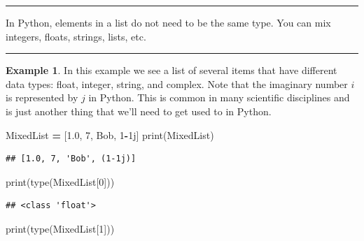 \documentclass[
]{book}
\newenvironment{Shaded}{\begin{snugshade}}{\end{snugshade}}
\newcommand{\BuiltInTok}[1]{#1}
\newcommand{\DecValTok}[1]{\textcolor[rgb]{0.00,0.00,0.81}{#1}}
\newcommand{\FloatTok}[1]{\textcolor[rgb]{0.00,0.00,0.81}{#1}}
\newcommand{\NormalTok}[1]{#1}
\newcommand{\OperatorTok}[1]{\textcolor[rgb]{0.81,0.36,0.00}{\textbf{#1}}}
\newcommand{\OtherTok}[1]{\textcolor[rgb]{0.56,0.35,0.01}{#1}}
\newcommand{\StringTok}[1]{\textcolor[rgb]{0.31,0.60,0.02}{#1}}
\theoremstyle{definition}
\theoremstyle{definition}
\newtheorem{example}{Example}[chapter]
\theoremstyle{definition}
\theoremstyle{remark}
\begin{document}
\begin{center}\rule{0.5\linewidth}{0.5pt}\end{center}

In Python, elements in a list do not need to be the same type. You can mix integers, floats, strings, lists, etc.

\begin{center}\rule{0.5\linewidth}{0.5pt}\end{center}

\begin{example}
\protect\hypertarget{exm:unnamed-chunk-642}{}{\label{exm:unnamed-chunk-642} }In this example we see a list of several items that have different data types: float, integer, string, and complex. Note that the imaginary number \(i\) is represented by \(j\) in Python. This is common in many scientific disciplines and is just another thing that we'll need to get used to in Python.
\end{example}

\begin{Shaded}
\begin{Highlighting}[]
\NormalTok{MixedList }\OperatorTok{=}\NormalTok{ [}\FloatTok{1.0}\NormalTok{, }\DecValTok{7}\NormalTok{, }\StringTok{\textquotesingle{}Bob\textquotesingle{}}\NormalTok{, }\DecValTok{1}\OperatorTok{{-}}\OtherTok{1j}\NormalTok{]}
\BuiltInTok{print}\NormalTok{(MixedList)}
\end{Highlighting}
\end{Shaded}

\begin{verbatim}
## [1.0, 7, 'Bob', (1-1j)]
\end{verbatim}

\begin{Shaded}
\begin{Highlighting}[]
\BuiltInTok{print}\NormalTok{(}\BuiltInTok{type}\NormalTok{(MixedList[}\DecValTok{0}\NormalTok{]))}
\end{Highlighting}
\end{Shaded}

\begin{verbatim}
## <class 'float'>
\end{verbatim}

\begin{Shaded}
\begin{Highlighting}[]
\BuiltInTok{print}\NormalTok{(}\BuiltInTok{type}\NormalTok{(MixedList[}\DecValTok{1}\NormalTok{]))}
\end{Highlighting}
\end{Shaded}
\end{document}
